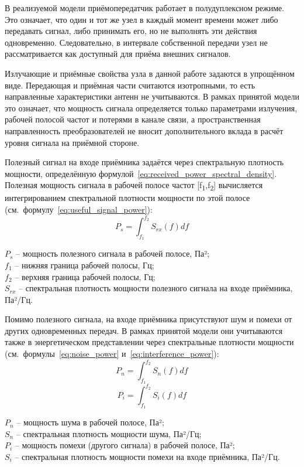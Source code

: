 \documentclass[
    numbers=section,
    document-code={ВКРБ--09.03.04--10.19--XX--26--81}
]{../latex/fqw}
\begin{document}
    В реализуемой модели приёмопередатчик работает в полудуплексном режиме.
    Это означает, что один и тот же узел в каждый момент времени может либо передавать сигнал, либо принимать его,
    но не выполнять эти действия одновременно.
    Следовательно, в интервале собственной передачи узел не рассматривается как доступный для приёма внешних сигналов.

    Излучающие и приёмные свойства узла в данной работе задаются в упрощённом виде.
    Передающая и приёмная части считаются изотропными, то есть направленные характеристики антенн не учитываются.
    В рамках принятой модели это означает, что мощность сигнала определяется только параметрами излучения,
    рабочей полосой частот и потерями в канале связи,
    а пространственная направленность преобразователей не вносит дополнительного вклада
    в расчёт уровня сигнала на приёмной стороне.

    Полезный сигнал на входе приёмника задаётся через спектральную плотность мощности,
    определённую формулой~\eqref{eq:received_power_spectral_density}.
    Полезная мощность сигнала в рабочей полосе частот {[}f\textsubscript{1},f\textsubscript{2}{]}
    вычисляется интегрированием спектральной плотности мощности по этой полосе
    (см.~формулу~\eqref{eq:useful_signal_power}):
    \begin{equation}
        P_{s} = \int_{f_{1}}^{f_{2}} S_{rx}(f) df
        \label{eq:useful_signal_power}
    \end{equation}
    \begin{FqwWhere}
        \(P_{s}\) -- мощность полезного сигнала в рабочей полосе, Па²;\\
        \(f_{1}\) -- нижняя граница рабочей полосы, Гц;\\
        \(f_{2}\) -- верхняя граница рабочей полосы, Гц;\\
        \(S_{rx}\) -- спектральная плотность мощности полезного сигнала на входе приёмника, Па²/Гц.
    \end{FqwWhere}

    Помимо полезного сигнала, на входе приёмника присутствуют шум и помехи от других одновременных передач.
    В рамках принятой модели они учитываются также в энергетическом представлении через спектральные плотности мощности
    (см.~формулы~\eqref{eq:noise_power} и~\eqref{eq:interference_power}):
    \begin{equation}
        P_{n} = \int_{f_{1}}^{f_{2}} S_{n}(f) df
        \label{eq:noise_power}
    \end{equation}
    \begin{equation}
        P_{i} = \int_{f_{1}}^{f_{2}} S_{i}(f) df
        \label{eq:interference_power}
    \end{equation}
    \begin{FqwWhere}
        \(P_{n}\) -- мощность шума в рабочей полосе, Па²;\\
        \(S_{n}\) -- спектральная плотность мощности шума, Па²/Гц;\\
        \(P_{i}\) -- мощность помехи (другого сигнала) в рабочей полосе, Па²;\\
        \(S_{i}\) -- спектральная плотность мощности помехи на входе приёмника, Па²/Гц.
    \end{FqwWhere}
\end{document}
